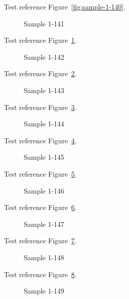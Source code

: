 Test reference Figure~\ref{fig:sample-1-140}.

\begin{figure}[tbhp]
\caption{Sample 1-141}
\label{fig:sample-1-141}
\end{figure}

Test reference Figure~\ref{fig:sample-1-141}.

\begin{figure}[tbhp]
\caption{Sample 1-142}
\label{fig:sample-1-142}
\end{figure}

Test reference Figure~\ref{fig:sample-1-142}.

\begin{figure}[tbhp]
\caption{Sample 1-143}
\label{fig:sample-1-143}
\end{figure}

Test reference Figure~\ref{fig:sample-1-143}.

\begin{figure}[tbhp]
\caption{Sample 1-144}
\label{fig:sample-1-144}
\end{figure}

Test reference Figure~\ref{fig:sample-1-144}.

\begin{figure}[tbhp]
\caption{Sample 1-145}
\label{fig:sample-1-145}
\end{figure}

Test reference Figure~\ref{fig:sample-1-145}.

\begin{figure}[tbhp]
\caption{Sample 1-146}
\label{fig:sample-1-146}
\end{figure}

Test reference Figure~\ref{fig:sample-1-146}.

\begin{figure}[tbhp]
\caption{Sample 1-147}
\label{fig:sample-1-147}
\end{figure}

Test reference Figure~\ref{fig:sample-1-147}.

\begin{figure}[tbhp]
\caption{Sample 1-148}
\label{fig:sample-1-148}
\end{figure}

Test reference Figure~\ref{fig:sample-1-148}.

\begin{figure}[tbhp]
\caption{Sample 1-149}
\label{fig:sample-1-149}
\end{figure}

